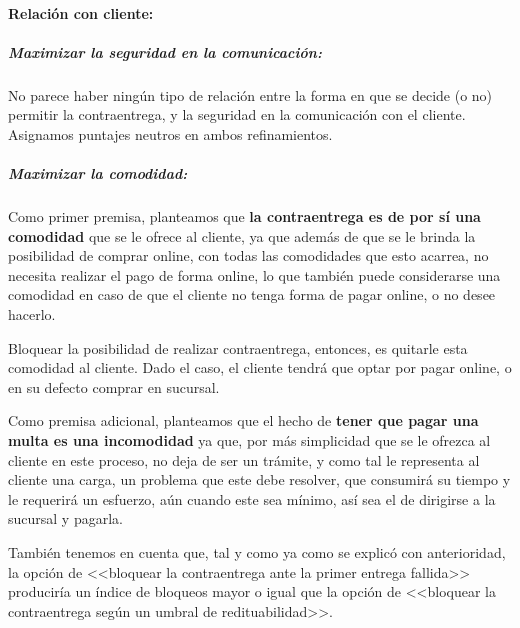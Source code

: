 \paragraph{Relación con cliente:}

\subparagraph{Maximizar la seguridad en la comunicación:}

No parece haber ningún tipo de relación entre la forma en que se decide (o no)
permitir la contraentrega, y la seguridad en la comunicación con el cliente.
Asignamos puntajes neutros en ambos refinamientos.

\subparagraph{Maximizar la comodidad:}

Como primer premisa, planteamos que \textbf{la contraentrega es de por sí una
comodidad} que se le ofrece al cliente, ya que además de que se le brinda la
posibilidad de comprar online, con todas las comodidades que esto acarrea, no
necesita realizar el pago de forma online, lo que también puede considerarse
una comodidad en caso de que el cliente no tenga forma de pagar online, o no
desee hacerlo. 

Bloquear la posibilidad de realizar contraentrega, entonces, es quitarle esta
comodidad al cliente. Dado el caso, el cliente tendrá que optar por pagar
online, o en su defecto comprar en sucursal.

Como premisa adicional, planteamos que el hecho de \textbf{tener que pagar una
multa es una incomodidad} ya que, por más simplicidad que se le ofrezca al
cliente en este proceso, no deja de ser un trámite, y como tal le representa
al cliente una carga, un problema que este debe resolver, que consumirá su
tiempo y le requerirá un esfuerzo, aún cuando este sea mínimo, así sea el de
dirigirse a la sucursal y pagarla.

También tenemos en cuenta que, tal y como ya como se explicó con anterioridad,
la opción de <<bloquear la contraentrega ante la primer entrega fallida>>
produciría un índice de bloqueos mayor o igual que la opción de <<bloquear la
contraentrega según un umbral de redituabilidad>>.

